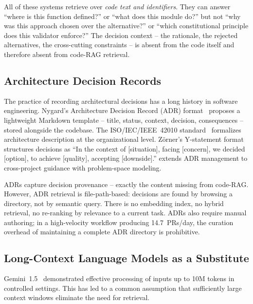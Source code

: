 \documentclass[11pt]{article}
\begin{document}
All of these systems retrieve over \emph{code text and identifiers}.
They can answer ``where is this function defined?'' or ``what does this module do?'' but not ``why was this approach chosen over the alternative?'' or ``which constitutional principle does this validator enforce?''
The decision context -- the rationale, the rejected alternatives, the cross-cutting constraints -- is absent from the code itself and therefore absent from code-RAG retrieval.

\subsection{Architecture Decision Records}
\label{sec:related-adr}

The practice of recording architectural decisions has a long history in software engineering.
Nygard's Architecture Decision Record (ADR) format~\citep{nygard2011adr} proposes a lightweight Markdown template -- title, status, context, decision, consequences -- stored alongside the codebase.
The ISO/IEC/IEEE~42010 standard~\citep{iso42010} formalizes architecture description at the organizational level.
Z\"orner's Y-statement format~\citep{zorner2015softwarearchitekturen} structures decisions as ``In the context of [situation], facing [concern], we decided [option], to achieve [quality], accepting [downside].''
\citet{zimmermann2015architectural} extends ADR management to cross-project guidance with problem-space modeling.

ADRs capture decision provenance -- exactly the content missing from code-RAG.
However, ADR retrieval is file-path-based: decisions are found by browsing a directory, not by semantic query.
There is no embedding index, no hybrid retrieval, no re-ranking by relevance to a current task.
ADRs also require manual authoring; in a high-velocity workflow producing 14.7~PRs/day, the curation overhead of maintaining a complete ADR directory is prohibitive.

\subsection{Long-Context Language Models as a Substitute}
\label{sec:related-longcontext}

Gemini~1.5~\citep{reid2024gemini} demonstrated effective processing of inputs up to 10M tokens in controlled settings.
This has led to a common assumption that sufficiently large context windows eliminate the need for retrieval.
\end{document}
